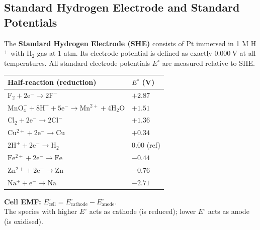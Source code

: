 \documentclass[12pt,a4paper]{article}
\begin{document}
\subsection{Standard Hydrogen Electrode and Standard Potentials}
\begin{tcolorbox}[defbox]
The \textbf{Standard Hydrogen Electrode (SHE)} consists of Pt immersed in 1 M H$^+$ with H$_2$ gas at 1 atm. Its electrode potential is defined as exactly $0.000\ \mathrm{V}$ at all temperatures. All standard electrode potentials $E^\circ$ are measured relative to SHE.
\end{tcolorbox}

\begin{tabularx}{\linewidth}{|B{5.0cm}|>{\centering\arraybackslash}X|}
\hline
\textbf{Half-reaction (reduction)} & \textbf{$E^\circ$ (V)} \\
\hline
$\mathrm{F_2 + 2e^- \to 2F^-}$ & $+2.87$ \\
\hline
$\mathrm{MnO_4^- + 8H^+ + 5e^- \to Mn^{2+} + 4H_2O}$ & $+1.51$ \\
\hline
$\mathrm{Cl_2 + 2e^- \to 2Cl^-}$ & $+1.36$ \\
\hline
$\mathrm{Cu^{2+} + 2e^- \to Cu}$ & $+0.34$ \\
\hline
$\mathrm{2H^+ + 2e^- \to H_2}$ & $0.00$ (ref) \\
\hline
$\mathrm{Fe^{2+} + 2e^- \to Fe}$ & $-0.44$ \\
\hline
$\mathrm{Zn^{2+} + 2e^- \to Zn}$ & $-0.76$ \\
\hline
$\mathrm{Na^+ + e^- \to Na}$ & $-2.71$ \\
\hline
\end{tabularx}

\textbf{Cell EMF:} $E^\circ_{\mathrm{cell}} = E^\circ_{\mathrm{cathode}} - E^\circ_{\mathrm{anode}}$.\\
The species with higher $E^\circ$ acts as cathode (is reduced); lower $E^\circ$ acts as anode (is oxidised).
\end{document}
